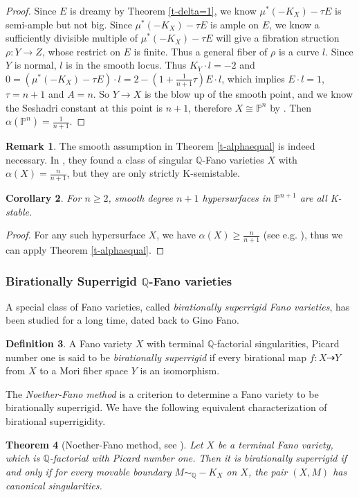 \documentclass[12pt,reqno]{amsart}%
\newtheorem{thm}{Theorem}[section]
\newtheorem{cor}[thm]{Corollary}
\theoremstyle{definition}
\newtheorem{defn}[thm]{Definition}
\newtheorem{rem}[thm]{Remark}
\theoremstyle{remark}
\newcommand{\bQ}{{\mathbb{Q}}}
\begin{document}
\begin{proof}
  Since $E$ is dreamy by Theorem \ref{t-delta=1}, we know $\mu^*(-K_X)-\tau E$ is semi-ample but not big. Since $\mu^*(-K_X)-\tau E$ is ample on $E$, we know a sufficiently divisible multiple of $\mu^*(-K_X)-\tau E$ will give a fibration struction $\rho\colon Y\to Z$, whose restrict on $E$ is finite. Thus a general fiber of $\rho$ is a curve $l$. Since $Y$ is normal, $l$ is in the smooth locus. Thus $K_Y\cdot l=-2$ and $0=(\mu^*(-K_X)-\tau E)\cdot l=2-(1+\frac{1}{n+1}\tau) E\cdot l$, which implies $E\cdot l=1$, $\tau=n+1$ and $A=n$. So $Y\to X$ is the blow up of the smooth point, and we know the Seshadri constant at this point is $n+1$, therefore $X\cong \mathbb{P}^n$ by \cite{LZ18}. Then $\alpha(\mathbb{P}^n)=\frac{1}{n+1}$.
\end{proof}
\begin{rem}The smooth assumption in Theorem \ref{t-alphaequal} is indeed necessary. In \cite{LZ19}, they found a class of singular $\mathbb{Q}$-Fano varieties $X$ with $\alpha(X)=\frac{n}{n+1}$, but they are only strictly K-semistable. 
\end{rem}
\begin{cor}\label{c-hypersurface}
For $n\ge 2$, smooth degree $n+1$ hypersurfaces in $\mathbb{P}^{n+1}$ are all K-stable.
\end{cor}
\begin{proof}For any such hypersurface $X$, we have $\alpha(X)\ge\frac{n}{n+1}$ (see e.g. \cite{Che01}), thus we can apply Theorem \ref{t-alphaequal}.
\end{proof}


\subsubsection{Birationally Superrigid $\mathbb{Q}$-Fano varieties}

A special class of Fano varieties, called {\it birationally superrigid Fano varieties}, has been studied for a long time, dated back to Gino Fano.  
\begin{defn}
A Fano variety $X$ with terminal $\bQ$-factorial singularities, Picard number one  is said to be {\it birationally superrigid }if
 every birational map
$f \colon X \dasharrow Y$ from $X$ to a Mori fiber space $Y$ is an isomorphism. 
\end{defn}

The {\it Noether-Fano method} is a criterion to determine a Fano variety to be birationally superrigid.  We have the following equivalent characterization of birational superrigidity.
\begin{thm}[Noether-Fano method, {see \cite[Section 5]{KSC04}}]\label{t-NFmethod}Let $X$ be a terminal Fano variety, which is $\mathbb{Q}$-factorial with Picard number one. Then it is birationally
superrigid if and only if for every movable boundary $M \sim_{\mathbb{Q}} -K_X$ on $X$, the pair $(X, M)$ has canonical singularities.
\end{thm}
\end{document}
